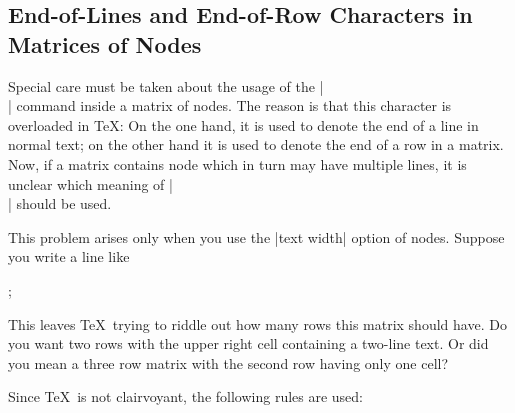 \subsection{End-of-Lines and End-of-Row Characters in Matrices of Nodes}

Special care must be taken about the usage of the |\\| command inside
a matrix of nodes. The reason is that this character is overloaded in
\TeX: On the one hand, it is used to denote the end of a line in
normal text; on the other hand it is used to denote the end of a row
in a matrix. Now, if a matrix contains node which in turn may have
multiple lines, it is unclear which meaning of |\\| should be used.

This problem arises only when you use the |text width| option of
nodes. Suppose you write a line like
\begin{codeexample}
;
\end{codeexample}
This leaves \TeX\ trying to riddle out how many rows this matrix
should have. Do you want two rows with the upper right cell containing
a two-line text. Or did you mean a three row matrix with the second
row having only one cell?

Since \TeX\ is not clairvoyant, the following rules are used:


